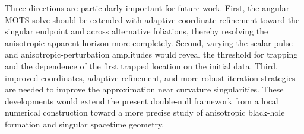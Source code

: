 Three directions are particularly important for future work.  First, the
angular MOTS solve should be extended with adaptive coordinate refinement
toward the singular endpoint and across alternative foliations, thereby
resolving the anisotropic apparent horizon more completely.  Second, varying
the scalar-pulse and anisotropic-perturbation
amplitudes would reveal the threshold for trapping and the dependence of the
first trapped location on the initial data.  Third, improved coordinates,
adaptive refinement, and more robust iteration strategies are needed to
improve the approximation near curvature singularities.  These developments
would extend the present double-null framework from a local numerical
construction toward a more precise study of anisotropic black-hole formation
and singular spacetime geometry.
